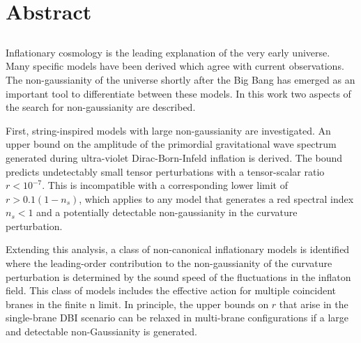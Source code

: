 \renewcommand{\CVSrevision}{\version$Id: abstract.tex,v 1.7 2009/08/15 17:00:02 ith Exp $}
% 
% 
\chapter*{Abstract}
\label{ch:abstract}
\section*{}
\singlespacing
Inflationary cosmology is the leading explanation of the very early universe. 
Many specific models have been derived which agree with current observations.
The non-gaussianity of the universe shortly after the Big Bang has emerged as
an important tool to differentiate between these models. In this work
two aspects of the search for non-gaussianity are described.

First, string-inspired models with large non-gaussianity are investigated.
An upper bound on the amplitude of the primordial gravitational wave spectrum
generated during ultra-violet Dirac-Born-Infeld inflation is derived. 
The bound predicts
undetectably small tensor perturbations with a tensor-scalar ratio $r <
10^{-7}$. 
This is incompatible with a corresponding lower limit of $r > 0.1
(1-n_s)$, which applies to any model that generates a red spectral index $n_s
<1$ and a potentially detectable non-gaussianity in the curvature perturbation.

Extending this analysis, a class of non-canonical inflationary models is
identified where the leading-order contribution to the non-gaussianity of the
curvature perturbation is determined by the sound speed of the fluctuations in
the inflaton field. 
This class of models includes the effective action for
multiple coincident branes in the finite n limit. 
In principle, the upper bounds on $r$ that arise in the single-brane
DBI scenario can be relaxed in multi-brane configurations if a large and
detectable non-Gaussianity is generated. 

